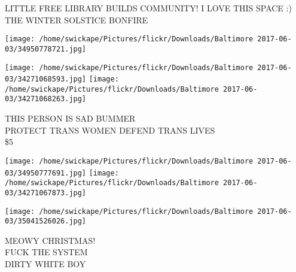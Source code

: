 \documentclass[10pt,letterpaper]{article}
\begin{document}
LITTLE FREE LIBRARY BUILDS COMMUNITY!  I LOVE THIS SPACE :)\\
THE WINTER SOLSTICE BONFIRE
\pagebreak

\texttt{[image: /home/swickape/Pictures/flickr/Downloads/Baltimore 2017-06-03/34950778721.jpg]}

\vspace{0.25in}
\texttt{[image: /home/swickape/Pictures/flickr/Downloads/Baltimore 2017-06-03/34271068593.jpg]}
\texttt{[image: /home/swickape/Pictures/flickr/Downloads/Baltimore 2017-06-03/34271068263.jpg]}

THIS PERSON IS SAD BUMMER\\
PROTECT TRANS WOMEN DEFEND TRANS LIVES\\
\$5
\pagebreak

\texttt{[image: /home/swickape/Pictures/flickr/Downloads/Baltimore 2017-06-03/34950777691.jpg]}
\texttt{[image: /home/swickape/Pictures/flickr/Downloads/Baltimore 2017-06-03/34271067873.jpg]}

\texttt{[image: /home/swickape/Pictures/flickr/Downloads/Baltimore 2017-06-03/35041526026.jpg]}

MEOWY CHRISTMAS!\\
FUCK THE SYSTEM\\
DIRTY WHITE BOY
\pagebreak
\end{document}
